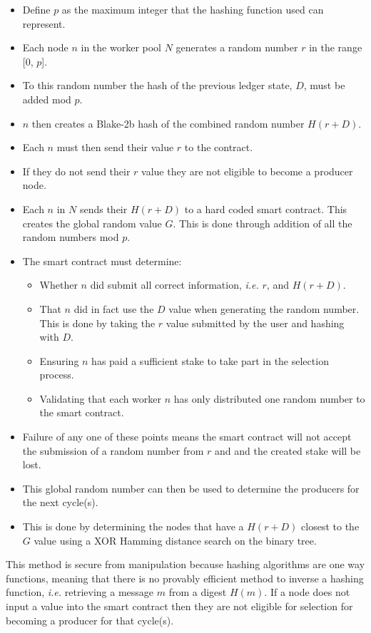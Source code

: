 \begin{itemize}

\item Define $p$ as the maximum integer that the hashing function used can represent.
\item Each node $n$ in the worker pool $N$ generates a random number $r$ in the range [0, $p$].
\item To this random number the hash of the previous ledger state, $D$, must be added mod $p$.
\item $n$ then creates a Blake-2b hash of the combined random number $H(r + D)$.
\item Each $n$ must then send their value $r$ to the contract.
\item If they do not send their $r$ value they are not eligible to become a producer node.
\item Each $n$ in $N$ sends their $H(r + D)$ to a hard coded smart contract. This creates the global random value $G$. This is done through addition of all the random numbers mod $p$.
\item The smart contract must determine:
\begin{itemize}
\item Whether $n$ did submit all correct information, \textit{i.e.} $r$, and $H(r+D)$.
\item That $n$ did in fact use the $D$ value when generating the random number. This is done by taking the $r$ value submitted by the user and hashing with $D$.
\item Ensuring $n$ has paid a sufficient stake to take part in the selection process.
\item Validating that each worker $n$ has only distributed one random number to the smart contract.
\end{itemize}
\item Failure of any one of these points means the smart contract will not accept the submission of a random number from $r$ and and the created stake will be lost.
\item This global random number can then be used to determine the producers for the next cycle(s).
\item This is done by determining the nodes that have a $H(r + D)$ closest to the $G$ value using a XOR Hamming distance search on the binary tree.\\

\end{itemize}

This method is secure from manipulation because hashing algorithms are one way functions, meaning that there is no provably efficient method to inverse a hashing function, \textit{i.e.} retrieving a message $m$ from a digest $H(m)$. If a node does not input a value into the smart contract then they are not eligible for selection for becoming a producer for that cycle(s). \\

